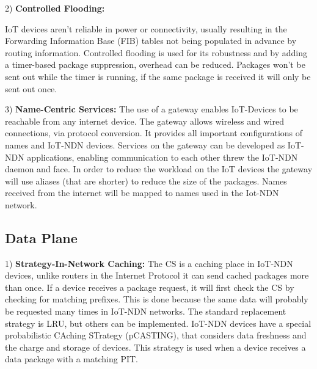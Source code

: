 \documentclass[conference]{IEEEtran}
\begin{document}
  2) \textbf{Controlled Flooding:}
  
  IoT devices aren't reliable in power or connectivity, usually resulting in the Forwarding Information Base (FIB) tables not being populated in advance by routing information. Controlled flooding is used for its robustness and by adding a timer-based package suppression, overhead can be reduced. Packages won't be sent out while the timer is running, if the same package is received it will only be sent out once.
  
  
  3) \textbf{Name-Centric Services:}
  The use of a gateway enables IoT-Devices to be reachable from any internet device. 
  The gateway allows wireless and wired connections, via protocol conversion. 
  It provides all important configurations of names and  IoT-NDN devices. Services on the gateway can be developed as IoT-NDN applications, enabling communication to each other threw the IoT-NDN daemon and face. 
  In order to reduce the workload on the IoT devices the gateway will use aliases (that are shorter) to reduce the size of the packages.
  Names received from the internet will be mapped to names used in the Iot-NDN network.
  
  \subsection{Data Plane}
  1) \textbf{Strategy-In-Network Caching:} 
  The CS is a caching place in IoT-NDN devices, unlike routers in the Internet Protocol it can send cached packages more than once.
  If a device receives a package request, it will first check the CS by checking for matching prefixes. 
  This is done because the same data will probably be requested many times in IoT-NDN networks.
  The standard replacement strategy is LRU, but others can be implemented. %
  IoT-NDN devices have a special probabilistic CAching STrategy (pCASTING), that considers data freshness and the charge and storage of devices. This strategy is used %
  when a device receives a data package with a matching PIT.
  
\end{document}
